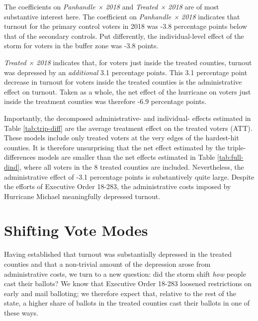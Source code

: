 \documentclass[
  12pt,
]{article}
\begin{document}
\begin{singlespace}


\end{singlespace}

The coefficients on \emph{Panhandle × 2018} and \emph{Treated × 2018} are of most substantive interest here. The coefficient on \emph{Panhandle × 2018} indicates that turnout for the primary control voters in 2018 was -3.8 percentage points below that of the secondary controls. Put differently, the individual-level effect of the storm for voters in the buffer zone was -3.8 points.

\emph{Treated × 2018} indicates that, for voters just inside the treated counties, turnout was depressed by an \emph{additional} 3.1 percentage points. This 3.1 percentage point decrease in turnout for voters inside the treated counties is the administrative effect on turnout. Taken as a whole, the net effect of the hurricane on voters just inside the treatment counties was therefore -6.9 percentage points.

Importantly, the decomposed administrative- and individual- effects estimated in Table \ref{tab:trip-diff} are the average treatment effect on the treated voters (ATT). These models include only treated voters at the very edges of the hardest-hit counties. It is therefore unsurprising that the net effect estimated by the triple-differences models are smaller than the net effects estimated in Table \ref{tab:full-dind}, where all voters in the 8 treated counties are included. Nevertheless, the administrative effect of -3.1 percentage points is substantively quite large. Despite the efforts of Executive Order 18-283, the administrative costs imposed by Hurricane Michael meaningfully depressed turnout.

\hypertarget{shifting-vote-modes}{%
\section*{Shifting Vote Modes}\label{shifting-vote-modes}}

Having established that turnout was substantially depressed in the treated counties and that a non-trivial amount of the depression arose from administrative costs, we turn to a new question: did the storm shift \emph{how} people cast their ballots? We know that Executive Order 18-283 loosened restrictions on early and mail balloting; we therefore expect that, relative to the rest of the state, a higher share of ballots in the treated counties cast their ballots in one of these ways.
\end{document}
